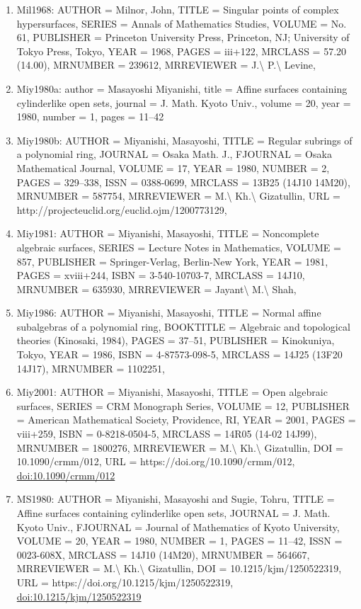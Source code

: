 \documentclass[11pt]{article}
\begin{document}
\begin{enumerate}[leftmargin=*]
  \item Mil1968: AUTHOR = Milnor, John, TITLE = Singular points of complex hypersurfaces, SERIES = Annals of Mathematics Studies, VOLUME = No. 61, PUBLISHER = Princeton University Press, Princeton, NJ; University of Tokyo Press, Tokyo, YEAR = 1968, PAGES = iii+122, MRCLASS = 57.20 (14.00), MRNUMBER = 239612, MRREVIEWER = J.\textbackslash{} P.\textbackslash{} Levine,
  \item Miy1980a: author = Masayoshi Miyanishi, title = Affine surfaces containing cylinderlike open sets, journal = J. Math. Kyoto Univ., volume = 20, year = 1980, number = 1, pages = 11--42
  \item Miy1980b: AUTHOR = Miyanishi, Masayoshi, TITLE = Regular subrings of a polynomial ring, JOURNAL = Osaka Math. J., FJOURNAL = Osaka Mathematical Journal, VOLUME = 17, YEAR = 1980, NUMBER = 2, PAGES = 329--338, ISSN = 0388-0699, MRCLASS = 13B25 (14J10 14M20), MRNUMBER = 587754, MRREVIEWER = M.\textbackslash{} Kh.\textbackslash{} Gizatullin, URL = http://projecteuclid.org/euclid.ojm/1200773129,
  \item Miy1981: AUTHOR = Miyanishi, Masayoshi, TITLE = Noncomplete algebraic surfaces, SERIES = Lecture Notes in Mathematics, VOLUME = 857, PUBLISHER = Springer-Verlag, Berlin-New York, YEAR = 1981, PAGES = xviii+244, ISBN = 3-540-10703-7, MRCLASS = 14J10, MRNUMBER = 635930, MRREVIEWER = Jayant\textbackslash{} M.\textbackslash{} Shah,
  \item Miy1986: AUTHOR = Miyanishi, Masayoshi, TITLE = Normal affine subalgebras of a polynomial ring, BOOKTITLE = Algebraic and topological theories (Kinosaki, 1984), PAGES = 37--51, PUBLISHER = Kinokuniya, Tokyo, YEAR = 1986, ISBN = 4-87573-098-5, MRCLASS = 14J25 (13F20 14J17), MRNUMBER = 1102251,
  \item Miy2001: AUTHOR = Miyanishi, Masayoshi, TITLE = Open algebraic surfaces, SERIES = CRM Monograph Series, VOLUME = 12, PUBLISHER = American Mathematical Society, Providence, RI, YEAR = 2001, PAGES = viii+259, ISBN = 0-8218-0504-5, MRCLASS = 14R05 (14-02 14J99), MRNUMBER = 1800276, MRREVIEWER = M.\textbackslash{} Kh.\textbackslash{} Gizatullin, DOI = 10.1090/crmm/012, URL = https://doi.org/10.1090/crmm/012, \href{https://doi.org/10.1090/crmm/012}{doi:10.1090/crmm/012}
  \item MS1980: AUTHOR = Miyanishi, Masayoshi and Sugie, Tohru, TITLE = Affine surfaces containing cylinderlike open sets, JOURNAL = J. Math. Kyoto Univ., FJOURNAL = Journal of Mathematics of Kyoto University, VOLUME = 20, YEAR = 1980, NUMBER = 1, PAGES = 11--42, ISSN = 0023-608X, MRCLASS = 14J10 (14M20), MRNUMBER = 564667, MRREVIEWER = M.\textbackslash{} Kh.\textbackslash{} Gizatullin, DOI = 10.1215/kjm/1250522319, URL = https://doi.org/10.1215/kjm/1250522319, \href{https://doi.org/10.1215/kjm/1250522319}{doi:10.1215/kjm/1250522319}

\end{enumerate}
\end{document}
